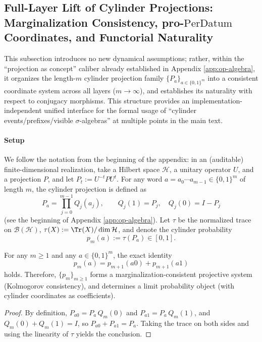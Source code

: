 \subsection{Full-Layer Lift of Cylinder Projections: Marginalization Consistency, pro-\texorpdfstring{$\mathrm{PerDatum}$}{PerDatum} Coordinates, and Functorial Naturality}\label{subsec:op-algebra-cylinder-properdatum}
This subsection introduces no new dynamical assumptions; rather, within the ``projection as concept'' caliber already established in Appendix \ref{app:op-algebra},
it organizes the length-\(m\) cylinder projection family \(\{P_a\}_{a\in\{0,1\}^m}\) into a consistent coordinate system across all layers (\(m\to\infty\)),
and establishes its naturality with respect to conjugacy morphisms. This structure provides an implementation-independent unified interface for the formal usage of ``cylinder events/prefixes/visible \(\sigma\)-algebras'' at multiple points in the main text.

\paragraph{Setup}
We follow the notation from the beginning of the appendix: in an (auditable) finite-dimensional realization, take a Hilbert space \(\mathcal{H}\), a unitary operator \(U\), and a projection \(P\), and let
\(
P_t:=U^{-t}PU^t
\).
For any word \(a=a_0\cdots a_{m-1}\in\{0,1\}^m\) of length \(m\), the cylinder projection is defined as
\[
P_a=\prod_{j=0}^{m-1}Q_j(a_j),
\qquad
Q_j(1)=P_j,\quad Q_j(0)=I-P_j
\]
(see the beginning of Appendix \ref{app:op-algebra}).
Let \(\tau\) be the normalized trace on \(\mathcal{B}(\mathcal{H})\), \(\tau(X):=\Tr(X)/\dim\mathcal{H}\), and denote the cylinder probability
\[
p_m(a):=\tau(P_a)\in[0,1].
\]

\begin{proposition}\label{prop:op-algebra-cylinder-marginalization}
For any \(m\ge 1\) and any \(a\in\{0,1\}^m\), the exact identity
\[
p_m(a)=p_{m+1}(a0)+p_{m+1}(a1)
\]
holds.
Therefore, \(\{p_m\}_{m\ge 1}\) forms a marginalization-consistent projective system (Kolmogorov consistency),
and determines a limit probability object (with cylinder coordinates as coefficients).
\end{proposition}

\begin{proof}
By definition,
\(
P_{a0}=P_a\,Q_m(0)
\)
and
\(
P_{a1}=P_a\,Q_m(1)
\),
and \(Q_m(0)+Q_m(1)=I\), so
\(
P_{a0}+P_{a1}=P_a
\).
Taking the trace on both sides and using the linearity of \(\tau\) yields the conclusion. \qedhere
\end{proof}

